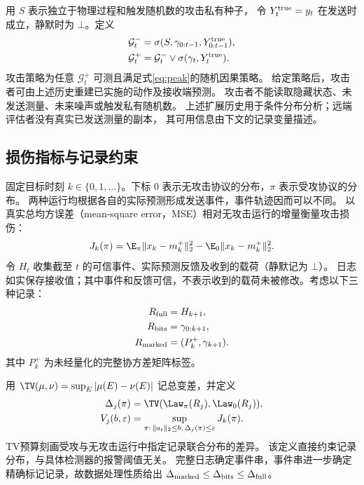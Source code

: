用 $S$ 表示独立于物理过程和触发随机数的攻击私有种子，
令 $Y_t^{\rm true}=y_t$ 在发送时成立，静默时为 $\bot$。定义
\begin{equation}
 \begin{aligned}
 \mathcal G_t^-&=\sigma(S,\gamma_{0:t-1},Y_{0:t-1}^{\rm true}),\\
 \mathcal G_t^+&=\mathcal G_t^-\vee\sigma(\gamma_t,Y_t^{\rm true}).
 \end{aligned}
 \label{eq:information}
\end{equation}
攻击策略为任意 $\mathcal G_t^+$ 可测且满足式\eqref{eq:peak}的随机因果策略。
给定策略后，攻击者可由上述历史重建已实施的动作及接收端预测。
攻击者不能读取隐藏状态、未发送测量、未来噪声或触发私有随机数。
上述扩展历史用于条件分布分析；远端评估者没有真实已发送测量的副本，
其可用信息由下文的记录变量描述。

\subsection{损伤指标与记录约束}
固定目标时刻 $k\in\{0,1,\ldots\}$。下标 $0$ 表示无攻击协议的分布，$\pi$ 表示受攻协议的分布。
两种运行均根据各自的实际预测形成发送事件，事件轨迹因而可以不同。
以真实总均方误差（mean-square error，MSE）相对无攻击运行的增量衡量攻击损伤：
\begin{equation}
 J_k(\pi)=\E_\pi\|x_k-m_k^+\|_2^2-
             \E_0\|x_k-m_k^+\|_2^2.
 \label{eq:damage}
\end{equation}
令 $H_t$ 收集截至 $t$ 的可信事件、实际预测反馈及收到的载荷（静默记为 $\bot$）。
日志如实保存接收值；其中事件和反馈可信，不表示收到的载荷未被修改。考虑以下三种记录：
\begin{equation}
 \begin{aligned}
 R_{\rm full}&=H_{k+1},\\
 R_{\rm bits}&=\gamma_{0:k+1},\\
 R_{\rm marked}&=(P_k^+,\gamma_{k+1}).
 \end{aligned}
 \label{eq:records}
\end{equation}
其中 $P_k^+$ 为未经量化的完整协方差矩阵标签。

用 $\TV(\mu,\nu)=\sup_E|\mu(E)-\nu(E)|$ 记总变差，并定义
\begin{equation}
 \begin{aligned}
 \Delta_j(\pi)&=\TV(\Law_\pi(R_j),\Law_0(R_j)),\\
 V_j(b,\varepsilon)&=\sup_{\pi:\,\|a_t\|_2\le b,\,\Delta_j(\pi)\le\varepsilon}J_k(\pi).
 \end{aligned}
 \label{eq:value}
\end{equation}
TV预算刻画受攻与无攻击运行中指定记录联合分布的差异。
该定义直接约束记录分布，与具体检测器的报警阈值无关。
完整日志确定事件串，事件串进一步确定精确标记记录，故数据处理性质给出
$\Delta_{\rm marked}\le\Delta_{\rm bits}\le\Delta_{\rm full}$。

